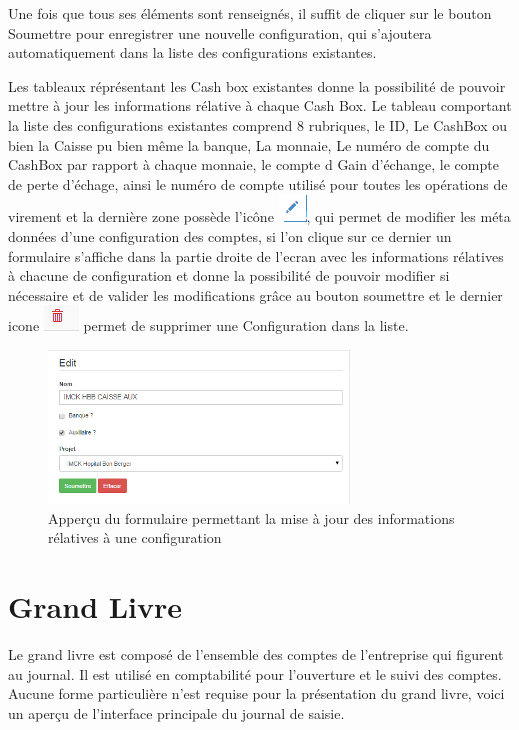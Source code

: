 \documentclass[12pt,a4paper]{report}
\begin{document}
Une fois que tous ses éléments sont renseignés, il suffit de cliquer sur le bouton Soumettre pour enregistrer une nouvelle configuration, qui s'ajoutera automatiquement dans la liste des configurations  existantes. 

Les tableaux réprésentant les Cash box existantes donne la possibilité de pouvoir mettre à jour les informations rélative à chaque Cash Box. Le tableau comportant la liste des configurations existantes comprend 8 rubriques, le ID, Le CashBox ou bien la Caisse pu bien même la banque, La monnaie, Le numéro de compte du CashBox par rapport à chaque monnaie, le compte d Gain d'échange, le compte de perte d'échage, ainsi le numéro de compte utilisé pour toutes les opérations de virement et la dernière  zone possède l'icône \includegraphics[scale=0.7]{pic/EditUser.png}, qui permet de modifier les méta données d'une configuration des comptes, si l'on clique sur ce dernier un formulaire s'affiche dans la partie droite de l'ecran avec les informations rélatives à chacune de configuration et donne la possibilité de pouvoir modifier si nécessaire et de valider les modifications grâce au bouton soumettre et le dernier icone \includegraphics[scale=0.7]{pic/DeleteWRed.png} permet de supprimer une Configuration dans la liste.
\begin{figure}[h]
\begin{center}
\includegraphics[width=8cm]{pic/EditCashBox.png}
\end{center}
\caption{Apperçu du formulaire permettant la mise à jour des informations rélatives à une configuration}
\label{Apperçu du formulaire permettant la mise à jour des informations rélatives à une configuration}
\end{figure} 

\newpage
\section{Grand Livre}
Le grand livre est composé de l’ensemble des comptes de l’entreprise qui figurent au journal. Il est utilisé en comptabilité pour l’ouverture et le suivi des comptes. Aucune forme particulière n’est requise pour la présentation du grand livre, voici un aperçu de l'interface principale du journal de saisie.
\end{document}
